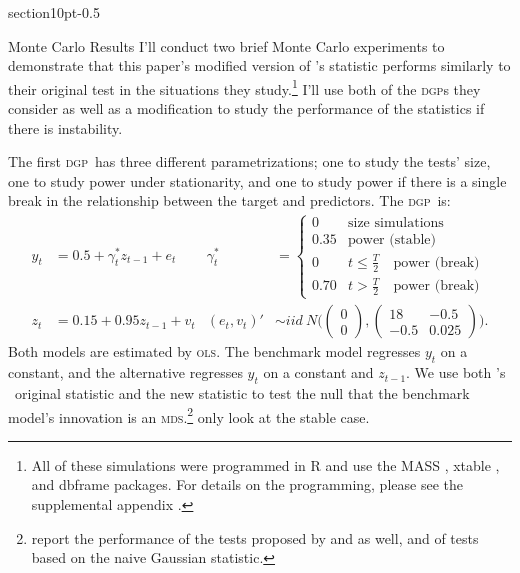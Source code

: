 \documentclass[11pt,fleqn]{article}
\makeatletter
\newcommand\citepos[2][]{\citeauthor{#2}'s \citeyearpar[#1]{#2}}
\newcommand\poscw{\citeauthor{ClW:06}'s \citeyearpar{ClW:06,ClW:07}}
\renewcommand\section{\@startsection%
{section}{1}{0pt}{-\baselineskip}{0.5\baselineskip}%
{\normalfont\normalsize\bfseries\large\raggedright}}
\theoremstyle{definition}
\newcommand{\dgp}{\textsc{dgp}}
\newcommand{\mds}{\textsc{mds}}
\newcommand{\ols}{\textsc{ols}}
\makeatother
\begin{document}
\section{Monte Carlo Results}\label{sec:2}
I'll conduct two brief Monte Carlo experiments to demonstrate that
this paper's modified version of \citepos{ClW:07} statistic performs
similarly to their original test in the situations they
study.\footnote{All of these simulations were programmed in R
  \citep[version 2.14.0]{R} and use the \textsc{MASS} \citep[version
  info]{VeR:02}, xtable \citep[1.6-0]{Dah:09}, and dbframe
  \citep[version 0.2.1]{Cal:10b} packages.  For details on the
  programming, please see the supplemental appendix \citep{Cal:11f}.}
I'll use both of the \dgp s they consider as well as a modification to
study the performance of the statistics if there is instability.

The first \dgp\ has three different parametrizations; one to study the
tests' size, one to study power under stationarity, and one to study
power if there is a single break in the relationship between the
target and predictors.  The \dgp\ is:
\begin{align*}
  y_t &= 0.5 + \gamma^{*}_t z_{t-1} + e_t &
  \gamma^{*}_t &=
  \begin{cases}
    0    & \text{size simulations} \\
    0.35 & \text{power (stable)} \\
    0    & t \leq \tfrac{T}{2} \quad \text{power (break)} \\
    0.70 & t > \tfrac{T}{2} \quad \text{power (break)}
  \end{cases}\\\nonumber
  z_t &= 0.15 + 0.95 z_{t-1} + v_t &
  (e_t, v_t)' &\sim iid\ N\Bigg(\begin{pmatrix} 0 \\ 0
  \end{pmatrix}
   , \begin{pmatrix} 18 & -
    0.5 \\ -0.5 & 0.025 \end{pmatrix}\Bigg).
\end{align*}
Both models are estimated by \ols. The benchmark model regresses $y_t$
on a constant, and the alternative regresses $y_t$ on a constant and
$z_{t-1}$.  We use both \poscw\ original statistic and the new
statistic to test the null that the benchmark model's innovation is an
\mds.\footnote{\citet{ClW:07} report the performance of the tests
  proposed by \citet{CCS:01} and \citet{ClM:05} as well, and of tests
  based on the naive Gaussian statistic.}  \citet{ClW:06,ClW:07} only
look at the stable case.
\end{document}
